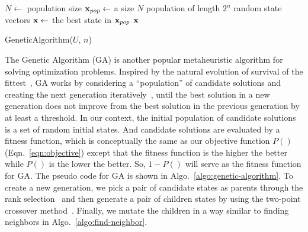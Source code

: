 \begin{algorithm}[ht]
        $N \leftarrow$ population size\;
	$\mathbf{x}_{pop} \leftarrow$ a size $N$ population of length $2^{n}$ random state vectors\;
        $\mathbf{x} \leftarrow$ the best state in $\mathbf{x}_{pop}$   \;
	\Return $\mathbf{x}$ \;
	\caption{GeneticAlgorithm($U$, $n$)}
\label{algo:genetic-algorithm}
\end{algorithm}

The Genetic Algorithm (GA) is another popular metaheuristic algorithm for solving optimization problems.
Inspired by the natural evolution of survival of the fittest~\cite{Holland_1992}, 
GA works by considering a ``population'' of candidate solutions and creating the
next generation iteratively~\cite{caitao2016}, until the best solution in a new generation does not
improve from the best solution in the previous generation by at least a threshold.
In our context, the initial population of candidate solutions is a set of random initial states. 
And candidate solutions are evaluated by a fitness function, which is conceptually the same as our 
objective function $P()$ (Eqn.~\ref{eqn:objective}) except that the fitness function is 
the higher the better while $P()$ is the lower the better.
So, $1-P()$ will serve as the fitness function for GA.
The pseudo code for GA is shown in Algo.~\ref{algo:genetic-algorithm}.
To create a new generation, we pick a pair of candidate states as parents through the 
rank selection~\cite{review-ga} and then generate a pair of children states by using the two-point 
crossover method~\cite{review-ga}. 
Finally, we mutate the children in a way similar to finding neighbors in Algo.~\ref{algo:find-neighbor}.

